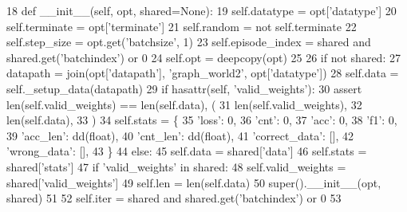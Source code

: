 \begin{DoxyCode}
18     \textcolor{keyword}{def }\_\_init\_\_(self, opt, shared=None):
19         self.datatype = opt[\textcolor{stringliteral}{'datatype'}]
20         self.terminate = opt[\textcolor{stringliteral}{'terminate'}]
21         self.random = \textcolor{keywordflow}{not} self.terminate
22         self.step\_size = opt.get(\textcolor{stringliteral}{'batchsize'}, 1)
23         self.episode\_index = shared \textcolor{keywordflow}{and} shared.get(\textcolor{stringliteral}{'batchindex'}) \textcolor{keywordflow}{or} 0
24         self.opt = deepcopy(opt)
25 
26         \textcolor{keywordflow}{if} \textcolor{keywordflow}{not} shared:
27             datapath = join(opt[\textcolor{stringliteral}{'datapath'}], \textcolor{stringliteral}{'graph\_world2'}, opt[\textcolor{stringliteral}{'datatype'}])
28             self.data = self.\_setup\_data(datapath)
29             \textcolor{keywordflow}{if} hasattr(self, \textcolor{stringliteral}{'valid\_weights'}):
30                 \textcolor{keyword}{assert} len(self.valid\_weights) == len(self.data), (
31                     len(self.valid\_weights),
32                     len(self.data),
33                 )
34             self.stats = \{
35                 \textcolor{stringliteral}{'loss'}: 0,
36                 \textcolor{stringliteral}{'cnt'}: 0,
37                 \textcolor{stringliteral}{'acc'}: 0,
38                 \textcolor{stringliteral}{'f1'}: 0,
39                 \textcolor{stringliteral}{'acc\_len'}: dd(float),
40                 \textcolor{stringliteral}{'cnt\_len'}: dd(float),
41                 \textcolor{stringliteral}{'correct\_data'}: [],
42                 \textcolor{stringliteral}{'wrong\_data'}: [],
43             \}
44         \textcolor{keywordflow}{else}:
45             self.data = shared[\textcolor{stringliteral}{'data'}]
46             self.stats = shared[\textcolor{stringliteral}{'stats'}]
47             \textcolor{keywordflow}{if} \textcolor{stringliteral}{'valid\_weights'} \textcolor{keywordflow}{in} shared:
48                 self.valid\_weights = shared[\textcolor{stringliteral}{'valid\_weights'}]
49         self.len = len(self.data)
50         super().\_\_init\_\_(opt, shared)
51 
52         self.iter = shared \textcolor{keywordflow}{and} shared.get(\textcolor{stringliteral}{'batchindex'}) \textcolor{keywordflow}{or} 0
53 
\end{DoxyCode}


